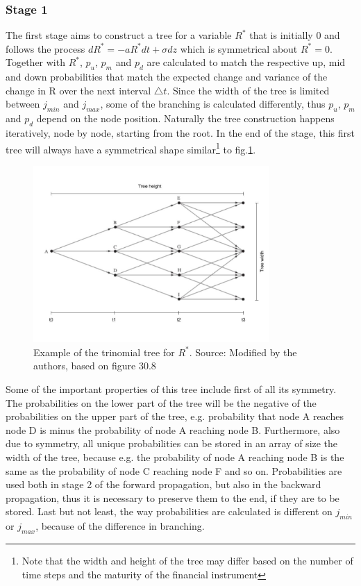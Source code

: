 \subsubsection*{Stage 1}
The first stage aims to construct a tree for a variable $R^*$ that is initially 0 and follows the process $dR^*=-aR^*dt + \sigma dz$ which is symmetrical about $R^*=0$\cite[pg.698-699]{ofod}. Together with $R^*$, $p_u$, $p_m$ and $p_d$ are calculated to match the respective up, mid and down probabilities that match the expected change and variance of the change in R over the next interval $\triangle t$. Since the width of the tree is limited between $j_{min}$ and $j_{max}$, some of the branching is calculated differently, thus $p_u$, $p_m$ and $p_d$ depend on the node position. Naturally the tree construction happens iteratively, node by node, starting from the root. In the end of the stage, this first tree will always have a symmetrical shape similar\footnote{Note that the width and height of the tree may differ based on the number of time steps and the maturity of the financial instrument} to fig.\ref{fig:treeconststage1}. 
\begin{figure}[H]
	\centering
	\includegraphics[width=0.8\textwidth]{img/treeconststage1wh.jpg}
	\caption{Example of the trinomial tree for $R^*$. Source: Modified by the authors, based on figure 30.8 \cite[pg. 699]{ofod}}
	\label{fig:treeconststage1}
\end{figure}

Some of the important properties of this tree include first of all its symmetry. The probabilities on the lower part of the tree will be the negative of the probabilities on the upper part of the tree, e.g. probability that node A reaches node D is minus the probability of node A reaching node B. Furthermore, also due to symmetry, all unique probabilities can be stored in an array of size the width of the tree, because e.g. the probability of node A reaching node B is the same as the probability of node C reaching node F and so on. Probabilities are used both in stage 2 of the forward propagation, but also in the backward propagation, thus it is necessary to preserve them to the end, if they are to be stored. Last but not least, the way probabilities are calculated is different on $j_{min}$ or $j_{max}$, because of the difference in branching. 

